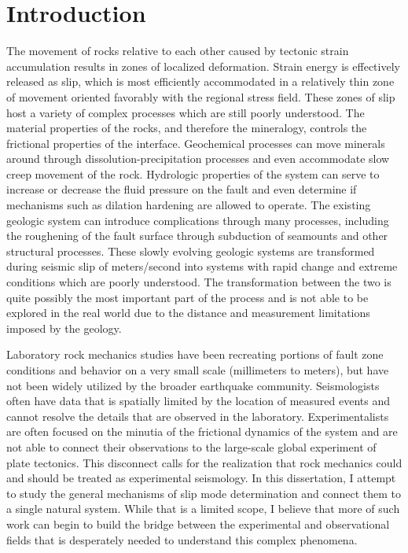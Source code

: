 \chapter*{Introduction}

The movement of rocks relative to each other caused by tectonic strain accumulation results in zones of localized deformation. Strain energy is effectively released as slip, which is most efficiently accommodated in a relatively thin zone of movement oriented favorably with the regional stress field. These zones of slip host a variety of complex processes which are still poorly understood. The material properties of the rocks, and therefore the mineralogy, controls the frictional properties of the interface. Geochemical processes can move minerals around through dissolution-precipitation processes and even accommodate slow creep movement of the rock. Hydrologic properties of the system can serve to increase or decrease the fluid pressure on the fault and even determine if mechanisms such as dilation hardening are allowed to operate. The existing geologic system can introduce complications through many processes, including the roughening of the fault surface through subduction of seamounts and other structural processes. These slowly evolving geologic systems are transformed during seismic slip of meters/second into systems with rapid change and extreme conditions which are poorly understood. The transformation between the two is quite possibly the most important part of the process and is not able to be explored in the real world due to the distance and measurement limitations imposed by the geology.

Laboratory rock mechanics studies have been recreating portions of fault zone conditions and behavior on a very small scale (millimeters to meters), but have not been widely utilized by the broader earthquake community. Seismologists often have data that is spatially limited by the location of measured events and cannot resolve the details that are observed in the laboratory. Experimentalists are often focused on the minutia of the frictional dynamics of the system and are not able to connect their observations to the large-scale global experiment of plate tectonics. This disconnect calls for the realization that rock mechanics could and should be treated as experimental seismology. In this dissertation, I attempt to study the general mechanisms of slip mode determination and connect them to a single natural system. While that is a limited scope, I believe that more of such work can begin to build the bridge between the experimental and observational fields that is desperately needed to understand this complex phenomena.

